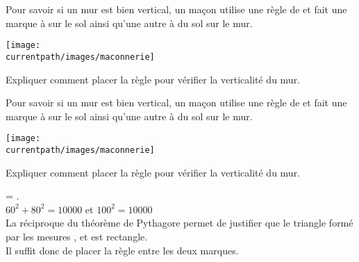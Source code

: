 \begin{exercice*}
    Pour savoir si un mur est bien vertical, un ma\c con utilise une règle de  et fait une marque à  sur le sol ainsi qu'une autre à 
     du sol sur le mur.

    \begin{minipage}{0.5\linewidth}
        \texttt{[image: \\currentpath/images/maconnerie]}
    \end{minipage}
    \begin{minipage}{0.5\linewidth}
        Expliquer comment placer la règle pour vérifier la verticalité du mur.
    \end{minipage}    
\end{exercice*}
\begin{corrige}
    Pour savoir si un mur est bien vertical, un ma\c con utilise une règle de  et fait une marque à  sur le sol ainsi qu'une autre à 
     du sol sur le mur.

    \begin{minipage}{0.45\linewidth}
        \texttt{[image: \\currentpath/images/maconnerie]}
    \end{minipage}
    \hfill
    \begin{minipage}{0.5\linewidth}
        Expliquer comment placer la règle pour vérifier la verticalité du mur.
    \end{minipage}  

    \medskip
    {\red {} = .\\
    $60^2+80^2=\num{10000}$ et $100^2=\num{10000}$\\
    La réciproque du théorème de Pythagore permet de justifier que le triangle formé par les mesures ,  et  est rectangle.\\
    Il suffit donc de placer la règle entre les deux marques.}
\end{corrige}

